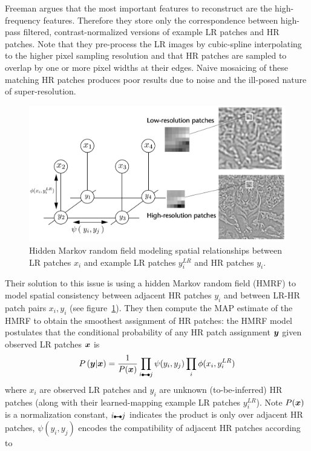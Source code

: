 Freeman \etal\cite{freeman2002example} argues that the most important features to reconstruct are the high-frequency features.
%
Therefore they store only the correspondence between high-pass filtered, contrast-normalized versions of example LR patches and HR patches.
%
Note that they pre-process the LR images by cubic-spline interpolating to the higher pixel sampling resolution and that HR patches are sampled to overlap by one or more pixel widths at their edges.
%
Naive mosaicing of these matching HR patches produces poor results due to noise and the ill-posed nature of super-resolution.
%
\begin{figure}
    \centering
    \includegraphics[width=\linewidth,keepaspectratio]{figures/classical/mrf.png}
    \caption{Hidden Markov random field modeling spatial relationships between LR patches \(x_i\) and example LR patches \(y_i^{LR}\) and HR patches \(y_i\)\cite{freeman2002example}.}
    \label{fig:mrf}
\end{figure}
Their solution to this issue is using a hidden Markov random field (HMRF) to model spatial consistency between adjacent HR patches \(y_i\) and between LR-HR patch pairs \(x_i, y_i\) (see figure~\ref{fig:mrf}).
%
They then compute the MAP estimate of the HMRF to obtain the smoothest assignment of HR patches: the HMRF model postulates that the conditional probability of any HR patch assignment \(\bm{y}\) given observed LR patches \(\bm{x}\) is
\begin{equation}
    P\left( \by \middle| \bx \right) = \frac{1}{P(\bx)} \prod_{i\ue{} j} \psi(y_i, y_j) \prod_i \phi(x_i, y_i^{LR})
\end{equation}
where \(x_i\) are observed LR patches and \(y_i\) are unknown (to-be-inferred) HR patches (along with their learned-mapping example LR patches \(y_i^{LR}\)).
%
Note \(P(\bm{x})\) is a normalization constant, \(i\ue{} j\) indicates the product is only over adjacent HR patches, \(\psi(y_i, y_j)\) encodes the compatibility of adjacent HR patches according to
